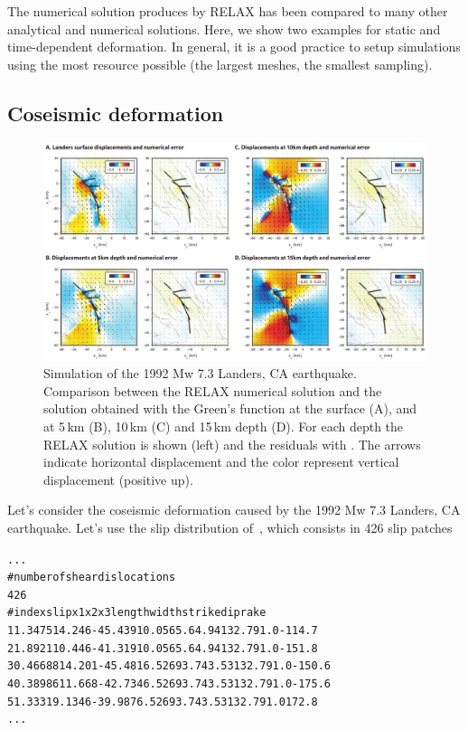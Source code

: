 \documentclass[10pt]{article}
\begin{document}
The numerical solution produces by RELAX has been compared to many other analytical and numerical solutions. Here, we show two examples for static and time-dependent deformation. In general, it is a good practice to setup simulations using the most resource possible (the largest meshes, the smallest sampling).

\subsection{Coseismic deformation}
%
\begin{figure}[h]
\centering
\includegraphics[width=\textwidth]{bm_landers.pdf}
\caption{\small Simulation of the 1992 Mw 7.3 Landers, CA earthquake. Comparison between the RELAX numerical solution and the solution obtained with the \cite{okada92} Green's function at the surface (A), and at 5\,km (B), 10\,km (C) and 15\,km depth (D). For each depth the RELAX solution is shown (left) and the residuals with \cite{okada92}. The arrows indicate horizontal displacement and the color represent vertical displacement (positive up). }
\label{fig:bm_landers}
\end{figure}
%
Let's consider the coseismic deformation caused by the 1992 Mw 7.3 Landers, CA earthquake. Let's use the slip distribution of~\citep{fi04c}, which consists in 426 slip patches
\begin{alltt}
...
# number of shear dislocations
{\color{orange}426}
# index slip x1 x2 x3 length width strike dip rake
{\color{orange}1 1.3475 14.246 -45.439 10.056 5.6 4.94 132.7 91.0 -114.7
2 1.8921 10.446 -41.319 10.056 5.6 4.94 132.7 91.0 -151.8
3 0.46688 14.201 -45.481 6.5269 3.74 3.53 132.7 91.0 -150.6
4 0.38986 11.668 -42.734 6.5269 3.74 3.53 132.7 91.0 -175.6
5 1.3331 9.1346 -39.987 6.5269 3.74 3.53 132.7 91.0 172.8}
...
\end{alltt}
\end{document}
